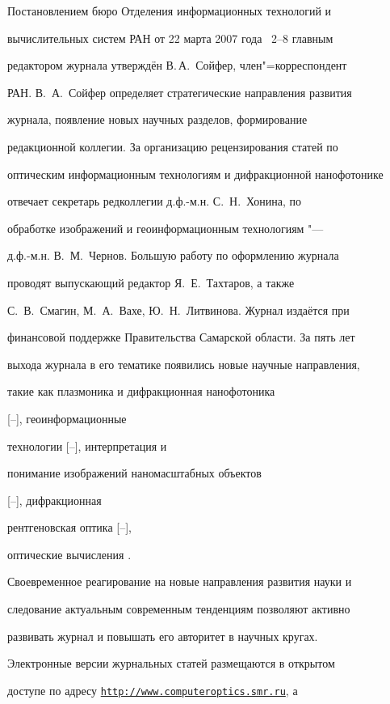 Постановлением бюро Отделения информационных технологий и

вычислительных систем РАН от 22 марта 2007 года \No\ 2--8 главным

редактором журнала утверждён В.\,А.~Сойфер, член"=корреспондент

РАН. В.~А.~Сойфер определяет стратегические направления развития

журнала, появление новых научных разделов, формирование

редакционной коллегии. За организацию рецензирования статей по

оптическим информационным технологиям и дифракционной нанофотонике

отвечает секретарь редколлегии д.ф.-м.н. С.~Н.~Хонина, по

обработке изображений и геоинформационным технологиям "---

д.ф.-м.н. В.~М.~Чернов. Большую работу по оформлению журнала

проводят выпускающий редактор Я.~Е.~Тахтаров, а также

С.~В.~Смагин, М.~А.~Вахе, Ю.~Н.~Литвинова. Журнал издаётся при

финансовой поддержке Правительства Самарской области. За пять лет

выхода журнала в его тематике появились новые научные направления,

такие как плазмоника и дифракционная нанофотоника

[--], геоинформационные

технологии [--], интерпретация и

понимание изображений наномасштабных объектов

[--], дифракционная

рентгеновская оптика [--],

оптические вычисления \cite{kol:bib19,kol:bib21,kol:bib23}.

Своевременное реагирование на новые направления развития науки и

следование актуальным современным тенденциям позволяют активно

развивать журнал и повышать его авторитет в научных кругах.

Электронные версии журнальных статей размещаются в открытом

доступе по адресу \href{http://www.computeroptics.smr.ru/}{\tt http://www.computeroptics.smr.ru}, а

